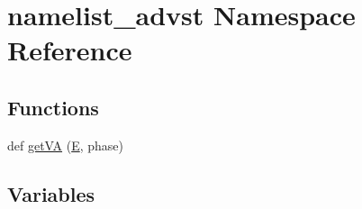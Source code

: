 \hypertarget{namespacenamelist__advst}{}\section{namelist\+\_\+advst Namespace Reference}
\label{namespacenamelist__advst}
\subsection*{Functions}
\begin{DoxyCompactItemize}
\item 
def \hyperlink{namespacenamelist__advst_a3758b0a794e6330d00611d7742b88280}{get\+VA} (\hyperlink{namespacenamelist__advst_a89a0569929742d239bf9833cfdfec1d0}{E}, phase)
\end{DoxyCompactItemize}
\subsection*{Variables}
